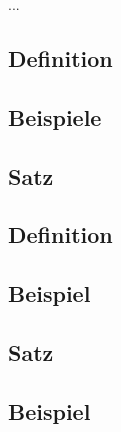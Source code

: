 ...

\subsection{Definition}

\subsection{Beispiele}

\subsection{Satz}

\subsection{Definition}

\subsection{Beispiel}

\subsection{Satz}

\subsection{Beispiel}

